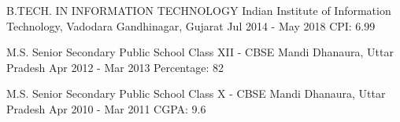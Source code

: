 

\begin{cventries}

  \cventry
    {B.TECH. IN INFORMATION TECHNOLOGY}
    {Indian Institute of Information Technology, Vadodara}
    {Gandhinagar, Gujarat}
    {Jul 2014 - May 2018}
    {CPI: 6.99}


  \cventry
    {M.S. Senior Secondary Public School}
    {Class XII - CBSE}
    {Mandi Dhanaura, Uttar Pradesh}
    {Apr 2012 - Mar 2013}
    {Percentage: 82}


  \cventry
    {M.S. Senior Secondary Public School}
    {Class X - CBSE}
    {Mandi Dhanaura, Uttar Pradesh}
    {Apr 2010 - Mar 2011}
    {CGPA: 9.6}
    
    
\end{cventries}

